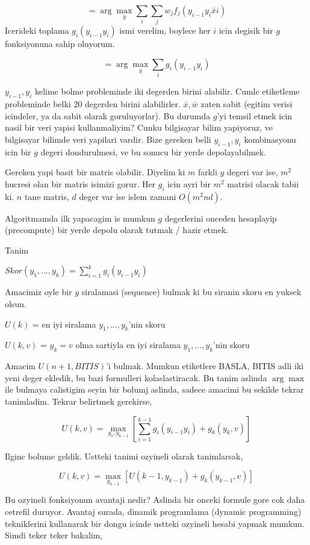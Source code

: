 \documentclass[12pt,fleqn]{article}\usepackage{../common}
\begin{document}
$$ = \arg\max_{\bar{y}}  \sum_i  \sum_j w_j f_j(y_{i-1}y_i \bar{x} i )$$
Icerideki toplama $g_i(y_{i-1}y_i)$ ismi verelim, boylece her $i$ icin
degisik bir $g$ fonksiyonuna sahip oluyorum. 

$$  = \arg\max_{\bar{y}}  \sum_i  g_i(y_{i-1}y_i) $$

$y_{i-1},y_i$ kelime bolme probleminde iki degerden birini alabilir. Cumle
etiketleme probleminde belki 20 degerden birini alabilirler. $\bar{x},\bar{w}$ zaten 
sabit (egitim verisi icindeler, ya da sabit olarak goruluyorlar). Bu 
durumda $g$'yi temsil etmek icin nasil bir veri yapisi kullanmaliyim? Cunku
bilgisayar bilim yapiyoruz, ve bilgisayar bilimde veri yapilari vardir. 
Bize gereken belli $y_{i-1},y_i$ kombinasyonu icin bir $g$ degeri
dondurulmesi, ve bu sonucu bir yerde depolayabilmek.

Gereken yapi basit bir matris olabilir. Diyelim ki $m$ farkli $y$ degeri
var ise, $m^2$ hucresi olan bir matris isimizi gorur. Her $g_i$ icin ayri
bir $m^2$ matrisi olacak tabii ki. $n$ tane matris, $d$ deger var ise 
islem zamani $O(m^2nd)$. 

Algoritmamda ilk yapacagim is mumkun $g$ degerlerini onceden hesaplayip
(precompute) bir yerde depolu olarak tutmak / hazir etmek. 

Tanim

$Skor(y_1,...,y_k) = \sum _{i=1}^{k} g_i(y_{i-1} y_i)$

Amacimiz oyle bir $y$ siralamasi (sequence) bulmak ki bu siranin skoru 
en yuksek olsun. 

$U(k)$ = en iyi siralama $y_1,...,y_k$'nin skoru

$U(k,v)$ = $y_k=v$ olma sartiyla en iyi siralama $y_1,...,y_k$'nin skoru

Amacim $U(n+1, BITIS)$'i bulmak. Mumkun etiketlere BASLA, BITIS adli iki
yeni deger ekledik, bu bazi formulleri kolaslastiracak. Bu tanim aslinda
$\arg\max$ ile bulmaya calistigim seyin bir bolumj aslinda, sadece amacimi
bu sekilde tekrar tanimladim. Tekrar belirtmek gerekirse, 

$$U(k,v) = \max_{y_1,y_{k-1}}  [ \sum _{ i=1}^{k-1}  g_i(y_{i-1}y_i) +  g_k(y_k,v) ]$$

Ilginc bolume geldik. Ustteki tanimi ozyineli olarak tanimlarsak, 

$$ U(k,v) = \max_{y_{k-1}} [ U({k-1},y_{k-1}) + g_k(y_{k-1},v)]  $$

Bu ozyineli fonksiyonun avantaji nedir? Aslinda bir onceki formule gore cok
daha cetrefil duruyor. Avantaj surada, dinamik programlama (dynamic
programming) tekniklerini kullanarak bir dongu icinde ustteki ozyineli
hesabi yapmak mumkun. Simdi teker teker bakalim,
\end{document}
